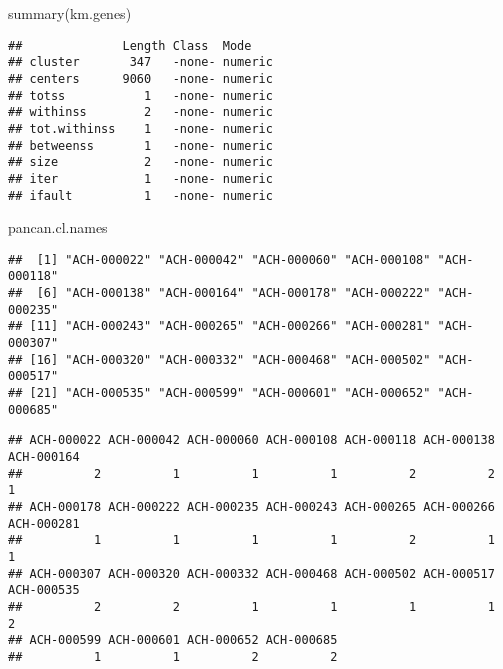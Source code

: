 \documentclass[
]{article}
\newenvironment{Shaded}{\begin{snugshade}}{\end{snugshade}}
\newcommand{\FunctionTok}[1]{\textcolor[rgb]{0.00,0.00,0.00}{#1}}
\newcommand{\NormalTok}[1]{#1}
\newcommand{\SpecialCharTok}[1]{\textcolor[rgb]{0.00,0.00,0.00}{#1}}
\begin{document}
\begin{Shaded}
\begin{Highlighting}[]
\FunctionTok{summary}\NormalTok{(km.genes)}
\end{Highlighting}
\end{Shaded}

\begin{verbatim}
##              Length Class  Mode   
## cluster       347   -none- numeric
## centers      9060   -none- numeric
## totss           1   -none- numeric
## withinss        2   -none- numeric
## tot.withinss    1   -none- numeric
## betweenss       1   -none- numeric
## size            2   -none- numeric
## iter            1   -none- numeric
## ifault          1   -none- numeric
\end{verbatim}

\begin{Shaded}
\begin{Highlighting}[]
\NormalTok{pancan.cl.names}
\end{Highlighting}
\end{Shaded}

\begin{verbatim}
##  [1] "ACH-000022" "ACH-000042" "ACH-000060" "ACH-000108" "ACH-000118"
##  [6] "ACH-000138" "ACH-000164" "ACH-000178" "ACH-000222" "ACH-000235"
## [11] "ACH-000243" "ACH-000265" "ACH-000266" "ACH-000281" "ACH-000307"
## [16] "ACH-000320" "ACH-000332" "ACH-000468" "ACH-000502" "ACH-000517"
## [21] "ACH-000535" "ACH-000599" "ACH-000601" "ACH-000652" "ACH-000685"
\end{verbatim}

\begin{Shaded}
\end{Shaded}

\begin{verbatim}
## ACH-000022 ACH-000042 ACH-000060 ACH-000108 ACH-000118 ACH-000138 ACH-000164 
##          2          1          1          1          2          2          1 
## ACH-000178 ACH-000222 ACH-000235 ACH-000243 ACH-000265 ACH-000266 ACH-000281 
##          1          1          1          1          2          1          1 
## ACH-000307 ACH-000320 ACH-000332 ACH-000468 ACH-000502 ACH-000517 ACH-000535 
##          2          2          1          1          1          1          2 
## ACH-000599 ACH-000601 ACH-000652 ACH-000685 
##          1          1          2          2
\end{verbatim}
\end{document}
